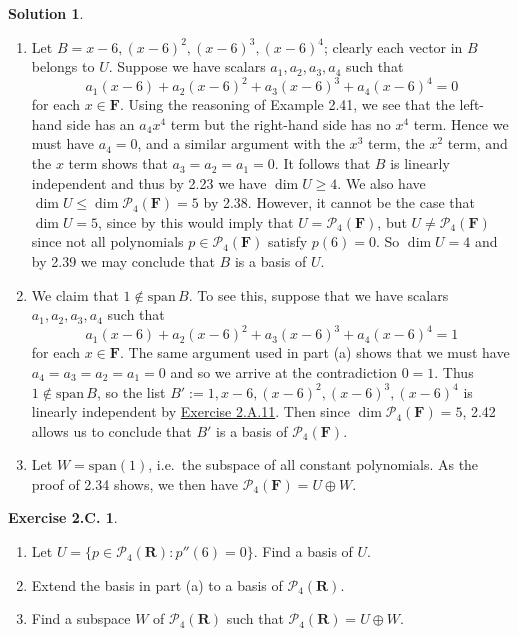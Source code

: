 \documentclass[12pt]{article}
\theoremstyle{definition}
\theoremstyle{exercise}
\newtheorem{exercise}{Exercise 2.C.}
\theoremstyle{solution}
\newtheorem*{solution}{Solution}
\newcommand{\poly}{\mathcal{P}}
\newcommand{\Span}{\text{span}}
\newcommand{\R}{\mathbf{R}}
\newcommand{\F}{\mathbf{F}}
\begin{document}
\begin{solution}
    \begin{enumerate}
        \item Let \( B = x - 6, (x - 6)^2, (x - 6)^3, (x - 6)^4 \); clearly each vector in \( B \) belongs to \( U \). Suppose we have scalars \( a_1, a_2, a_3, a_4 \) such that
        \[
            a_1 (x - 6) + a_2 (x - 6)^2 + a_3 (x - 6)^3 + a_4 (x - 6)^4 = 0
        \]
        for each \( x \in \F \). Using the reasoning of Example 2.41, we see that the left-hand side has an \( a_4 x^4 \) term but the right-hand side has no \( x^4 \) term. Hence we must have \( a_4 = 0 \), and a similar argument with the \( x^3 \) term, the \( x^2 \) term, and the \( x \) term shows that \( a_3 = a_2 = a_1 = 0 \). It follows that \( B \) is linearly independent and thus by 2.23 we have \( \dim U \geq 4 \). We also have \( \dim U \leq \dim \poly_4(\F) = 5 \) by 2.38. However, it cannot be the case that \( \dim U = 5 \), since by  this would imply that \( U = \poly_4(\F) \), but \( U \neq \poly_4(\F) \) since not all polynomials \( p \in \poly_4(\F) \) satisfy \( p(6) = 0 \). So \( \dim U = 4 \) and by 2.39 we may conclude that \( B \) is a basis of \( U \).

        \item We claim that \( 1 \not\in \Span\,B \). To see this, suppose that we have scalars \( a_1, a_2, a_3, a_4 \) such that
        \[
            a_1 (x - 6) + a_2 (x - 6)^2 + a_3 (x - 6)^3 + a_4 (x - 6)^4 = 1
        \]
        for each \( x \in \F \). The same argument used in part (a) shows that we must have \( a_4 = a_3 = a_2 = a_1 = 0 \) and so we arrive at the contradiction \( 0 = 1 \). Thus \( 1 \not\in \Span\,B \), so the list \( B' := 1, x - 6, (x - 6)^2, (x - 6)^3, (x - 6)^4 \) is linearly independent by \href{https://lew98.github.io/Mathematics/LADR_Section_2_A_Exercises.pdf}{Exercise 2.A.11}. Then since \( \dim \poly_4(\F) = 5 \), 2.42 allows us to conclude that \( B' \) is a basis of \( \poly_4(\F) \).

        \item Let \( W = \Span(1) \), i.e.\ the subspace of all constant polynomials. As the proof of 2.34 shows, we then have \( \poly_4(\F) = U \oplus W \).
    \end{enumerate}
\end{solution}

\begin{exercise}
\label{ex:5}
    \begin{enumerate}
        \item Let \( U = \{ p \in \poly_4(\R) : p''(6) = 0 \} \). Find a basis of \( U \).

        \item Extend the basis in part (a) to a basis of \( \poly_4(\R) \).

        \item Find a subspace \( W \) of \( \poly_4(\R) \) such that \( \poly_4(\R) = U \oplus W \).
    \end{enumerate}
\end{exercise}
    
\end{document}
